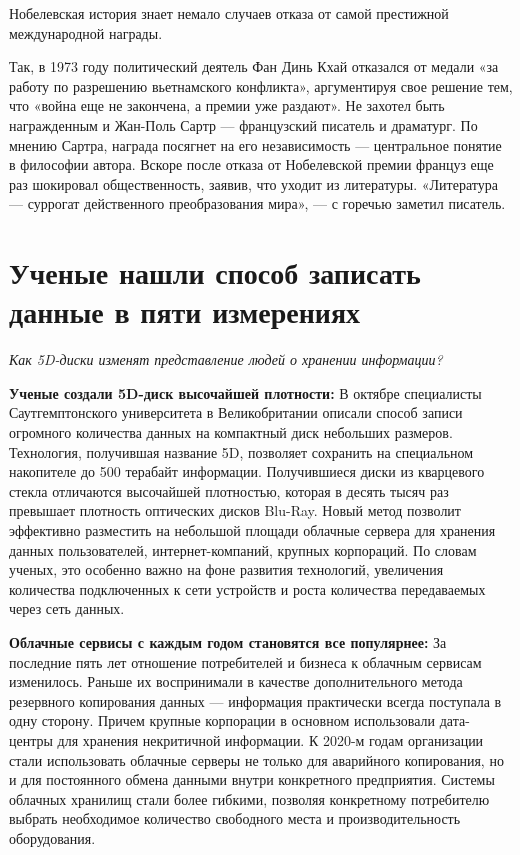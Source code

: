 Нобелевская история знает немало случаев отказа от самой престижной международной награды.

Так, в 1973 году политический деятель Фан Динь Кхай отказался от медали «за работу по разрешению вьетнамского конфликта», аргументируя свое решение тем, что «война еще не закончена, а премии уже раздают». Не захотел быть награжденным и Жан-Поль Сартр --- французский писатель и драматург. По мнению Сартра, награда посягнет на его независимость --- центральное понятие в философии автора. Вскоре после отказа от Нобелевской премии француз еще раз шокировал общественность, заявив, что уходит из литературы. «Литература --- суррогат действенного преобразования мира», --- с горечью заметил писатель.

\section{Ученые нашли способ записать данные в пяти измерениях}

\textit{Как 5D-диски изменят представление людей о хранении информации?}

\textbf{Ученые создали 5D-диск высочайшей плотности:} В октябре специалисты Саутгемптонского университета в Великобритании описали способ записи огромного количества данных на компактный диск небольших размеров. Технология, получившая название 5D, позволяет сохранить на специальном накопителе до 500 терабайт информации. Получившиеся диски из кварцевого стекла отличаются высочайшей плотностью, которая в десять тысяч раз превышает плотность оптических дисков Blu-Ray. Новый метод позволит эффективно разместить на небольшой площади облачные сервера для хранения данных пользователей, интернет-компаний, крупных корпораций. По словам ученых, это особенно важно на фоне развития технологий, увеличения количества подключенных к сети устройств и роста количества передаваемых через сеть данных.

\textbf{Облачные сервисы с каждым годом становятся все популярнее:}
За последние пять лет отношение потребителей и бизнеса к облачным сервисам изменилось. Раньше их воспринимали в качестве дополнительного метода резервного копирования данных --- информация практически всегда поступала в одну сторону. Причем крупные корпорации в основном использовали дата-центры для хранения некритичной информации. К 2020-м годам организации стали использовать облачные серверы не только для аварийного копирования, но и для постоянного обмена данными внутри конкретного предприятия. Системы облачных хранилищ стали более гибкими, позволяя конкретному потребителю выбрать необходимое количество свободного места и производительность оборудования.

